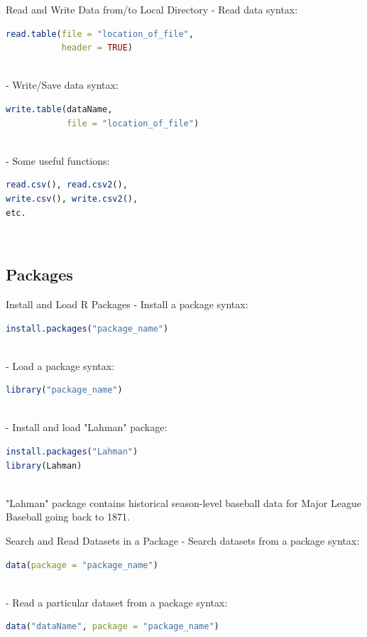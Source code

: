 \documentclass{beamer}
\begin{document}
\begin{frame}[fragile]{Read and Write Data from/to Local Directory}
- Read data syntax:
\begin{lstlisting}[language=R]
read.table(file = "location_of_file", 
           header = TRUE)
\end{lstlisting}\\

- Write/Save data syntax:
\begin{lstlisting}[language=R]
write.table(dataName, 
            file = "location_of_file")
\end{lstlisting}\\

- Some useful functions:
\begin{lstlisting}[language=R]
read.csv(), read.csv2(), 
write.csv(), write.csv2(), 
etc.
\end{lstlisting}\\

\end{frame}

\subsection{Packages}

\begin{frame}[fragile]{Install and Load R Packages}
- Install a package syntax:
\begin{lstlisting}[language=R]
install.packages("package_name")
\end{lstlisting}\\

- Load a package syntax:
\begin{lstlisting}[language=R]
library("package_name")
\end{lstlisting}\\

- Install and load "Lahman" package:
\begin{lstlisting}[language=R]
install.packages("Lahman")
library(Lahman)
\end{lstlisting}\\

"Lahman" package contains historical season-level baseball data for Major League Baseball going back to 1871.
    
\end{frame}

\begin{frame}[fragile]{Search and Read Datasets in a Package}
- Search datasets from a package syntax:
\begin{lstlisting}[language=R]
data(package = "package_name")
\end{lstlisting}\\

- Read a particular dataset from a package syntax:
\begin{lstlisting}[language=R]
data("dataName", package = "package_name")
\end{lstlisting}
\end{frame}
\end{document}
